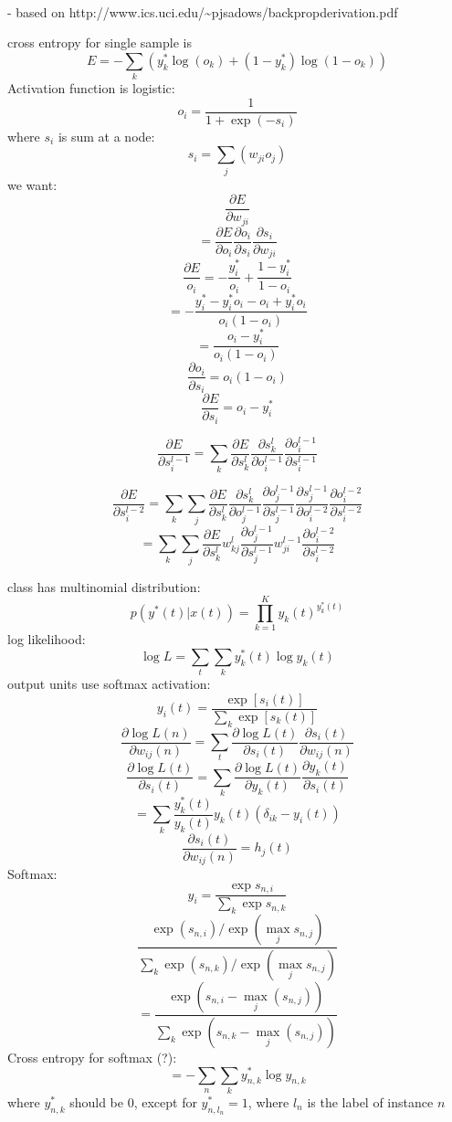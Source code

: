 \documentclass[a4paper,12pt,fleqn]{article}
\newcommand{\ult}{\vspace{12px}\noindent}
\newcommand{\ul}{\\ \indent -  }
\begin{document}
\ult{sigmoid}
  \ul based on http://www.ics.uci.edu/\~{ }pjsadows/backpropderivation.pdf

cross entropy for single sample is \[ E = - \sum_k ( y^*_k \log( o_k ) + ( 1 - y^*_k) \log(1 - o_k) ) \]
Activation function is logistic: \[ o_i = \frac{1}{1 + \exp(-s_i)} \]
where $s_i$ is sum at a node: \[ s_i = \sum_j( w_{ji}o_j ) \]
we want: \[ \frac{\partial E}{\partial w_{ji}} \]
\[ = \frac{\partial E}{\partial o_i}
\frac{\partial o_i}{\partial s_i}
\frac{\partial s_i}{\partial w_{ji}} \]
\[ \frac{\partial E}{o_i} = - \frac{y^*_i}{o_i} + \frac{1 - y^*_i}{1 - o_i} \]
\[ = - \frac{y^*_i - y^*_i o_i - o_i + y^*_i o_i }       {o_i(1 - o_i)} \] 
\[ = \frac{o_i - y^*_i }       {o_i(1 - o_i )} \] 
\[\frac{\partial o_i}{\partial s_i} = o_i(1-o_i) \]
\[ \frac{\partial E }{\partial s_i} = o_i - y^*_i \]

\[ \frac{\partial E}{\partial s^{l-1}_i} = \sum_k \frac{\partial E}{\partial s^l_k}  \frac{\partial s^l_k}{\partial o^{l-1}_i}   \frac{\partial o^{l-1}_i}{\partial s^{l-1}_i} \]

\[ \frac{\partial E}{\partial s^{l-2}_i} = \sum_k \sum_j \frac{\partial E}{\partial s^l_k}  \frac{\partial s^l_k}{\partial o^{l-1}_j}   \frac{\partial o^{l-1}_j}{\partial s^{l-1}_j}
\frac{\partial s^{l-1}_j}{\partial o^{l-2}_i}   \frac{\partial o^{l-2}_i}{\partial s^{l-2}_i} \]
\[ = \sum_k \sum_j \frac{\partial E}{\partial s^l_k}  w^l_{kj}   \frac{\partial o^{l-1}_j}{\partial s^{l-1}_j}
w^{l-1}_{ji}   \frac{\partial o^{l-2}_i}{\partial s^{l-2}_i} \]

\ult{classification}

class has multinomial distribution: \[ p(y^*(t)|x(t)) = \prod_{k=1}^K y_k(t)^{y_k^*(t)} \]
log likelihood: \[ \log L = \sum_t \sum_k y^*_k (t) \log y_k (t) \]
output units use softmax activation: \[ y_i(t) = \frac{\exp[s_i(t)]}{\sum_k \exp[s_k(t)]} \]
\[ \frac{\partial \log L(n)}{\partial w_{ij}(n)} = \sum_t \frac{\partial \log L(t)}{\partial s_i(t)} \frac{\partial s_i(t)}{\partial w_{ij}(n)} \]
\[ \frac{\partial \log L(t)}{\partial s_i(t)} = \sum_k \frac{\partial \log L(t)}{\partial y_k(t)} \frac{\partial y_k(t)}{\partial s_i(t)} \]
\[ = \sum_k \frac{y^*_k(t)}{y_k(t)} y_k(t) ( \delta_{ik} - y_i(t)) \]
\[ \frac{\partial s_i(t)}{\partial w_{ij}(n)} = h_j(t) \]
Softmax: \[ y_i = \frac{\exp s_{n,i}}{\sum_k \exp s_{n,k}} \]
   \[ \frac{\exp( s_{n,i}) / \exp( \max_j s_{n,j} )}{\sum_k \exp (s_{n,k} )/ \exp( \max_j s_{n,j} ) } \]
   \[ = \frac{\exp( s_{n,i} - \max_j( s_{n,j}))}     {\sum_k \exp( s_{n,k} - \max_j(s_{n,j})   )} \]
Cross entropy for softmax (?): \[ = - \sum_n \sum_k y^*_{n,k} \log y_{n,k} \] where $y^*_{n,k}$ should be 0, except for $y^*_{n,l_n} = 1$, where $l_n$ is the label of instance $n$
\end{document}
